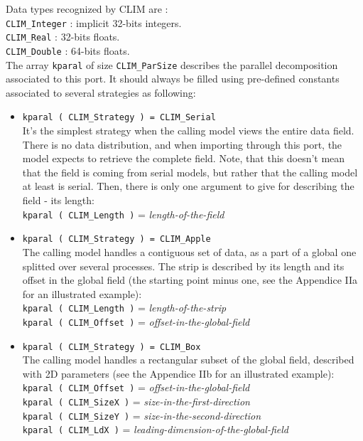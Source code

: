 \begin{description}
    Data types recognized by CLIM are : \\
    \hspace*{2cm} {\tt CLIM\_Integer} : implicit 32-bits integers.\\
    \hspace*{2cm} {\tt CLIM\_Real} : 32-bits floats. \\
    \hspace*{2cm} {\tt CLIM\_Double} : 64-bits floats. \\
  
    The array {\tt kparal} of size {\tt CLIM\_ParSize} 
    describes the parallel decomposition
    associated to this port. It should always be filled using pre-defined
    constants associated to several strategies as following: \\
    \begin{itemize}
      \item {\tt kparal ( CLIM\_Strategy ) = CLIM\_Serial} \\
        It's the simplest strategy when the calling model views the
        entire data field. There is no data distribution, and when
        importing through this port, the model expects to retrieve
        the complete field. Note, that this doesn't mean that the field
        is coming from serial models, but rather that the calling
        model at least is serial. Then, there is only one argument to
        give for describing the field - its length:\\
        {\tt kparal ( CLIM\_Length )} = {\it length-of-the-field} \\

      \item  {\tt kparal ( CLIM\_Strategy ) =  CLIM\_Apple} \\
        The calling model handles a contiguous set of
        data, as a part of a global one splitted over several processes. 
        The strip is described by its length and its offset in the
        global field (the starting point minus one, see the Appendice 
        IIa for an illustrated example):\\
        {\tt kparal ( CLIM\_Length )} = {\it length-of-the-strip} \\
        {\tt kparal ( CLIM\_Offset )} = {\it offset-in-the-global-field} \\

      \item  {\tt kparal ( CLIM\_Strategy ) = CLIM\_Box} \\
        The calling model handles a rectangular subset of the global
        field, described with 2D parameters (see the Appendice IIb for
        an illustrated example):\\
        {\tt kparal ( CLIM\_Offset )} = {\it offset-in-the-global-field} \\
        {\tt kparal ( CLIM\_SizeX  )} = {\it size-in-the-first-direction} \\
        {\tt kparal ( CLIM\_SizeY  )} = {\it size-in-the-second-direction} \\
        {\tt kparal ( CLIM\_LdX    )} = 
             {\it leading-dimension-of-the-global-field} \\


\end{itemize}
\end{description}
